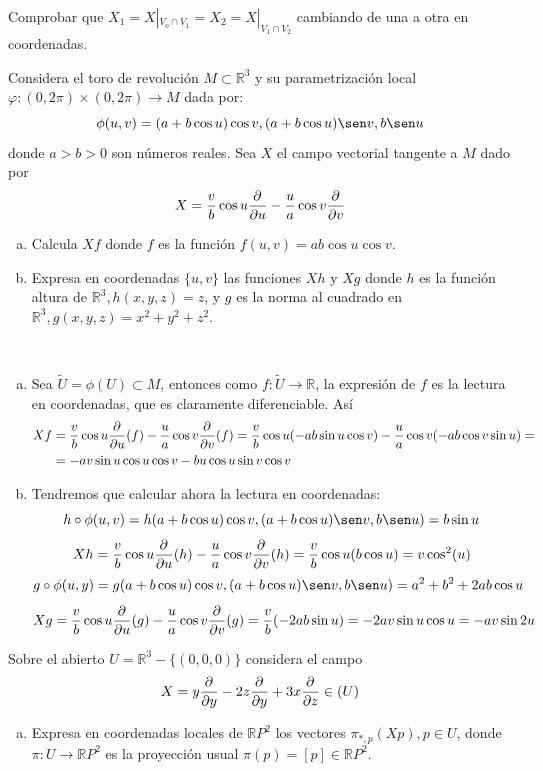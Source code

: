 \begin{sol}
    Comprobar que $X_1=X|_{V_o \cap V_1} = X_2 = X|_{V_1\cap V_2}$ cambiando de una a otra en coordenadas.
\end{sol}
\begin{ejer}
    [4.3] Considera el toro de revoluci\'on $M \subset \mathbb R^3$ y su parametrizaci\'on local $\varphi : (0, 2\pi) \times (0, 2\pi)\to M$ dada por: 
    $$\phi(u, v) = (a + b \cos u) \cos v, (a + b \cos u) \sen v, b \sen u $$ donde $a > b > 0$ son n\'umeros reales. Sea $X$ el campo vectorial tangente a $M$ dado por $$X = \frac{v}{b} \cos u \dfrac{\partial^{} }{\partial u} - \frac{u}{a} \cos v \dfrac{\partial^{} }{\partial v}$$
    \begin{enumerate}[a)]
        \item Calcula $Xf$ donde $f$ es la funci\'on $f(u, v) = ab \cos u \cos v$.
        \item Expresa en coordenadas $\{u, v\}$ las funciones $Xh$ y $Xg$ donde $h$ es la funci\'on altura de $\mathbb R^3, h(x, y, z) = z$, y $g$ es la norma al cuadrado en $\mathbb R^3, g(x, y, z) = x^2 + y^2 + z^2$.
    \end{enumerate}
\end{ejer}\begin{sol}\, \begin{enumerate}[a)]
    \item Sea $\tilde U = \phi(U) \subset M$, entonces como $f:\tilde U \longrightarrow \mathbb R$, la expresi\'on de $f$ es la lectura en coordenadas, que es claramente diferenciable. As\'i
    \[\begin{split} Xf & =\frac{v}{b} \cos u \dfrac{\partial^{} }{\partial u}(f) - \frac{u}{a} \cos v \dfrac{\partial^{} }{\partial v}(f) = \frac{v}{b} \cos u (-ab\sin u \cos v) - \frac{u}{a} \cos v (-ab\cos v \sin u) = \\ & = -av \sin u \cos u \cos v - bu \cos u \sin v \cos v\end{split}\]
    \item Tendremos que calcular ahora la lectura en coordenadas:
    $$h \circ \phi(u,v) = h(a + b \cos u) \cos v, (a + b \cos u) \sen v, b \sen u) = b\sin u$$
    $$Xh  = \frac{v}{b} \cos u \dfrac{\partial^{} }{\partial u}(h) - \frac{u}{a} \cos v \dfrac{\partial^{} }{\partial v}(h)=\frac{v}{b} \cos u (b \cos u)=v \cos^2(u)$$
    $$g\circ \phi(u,y) = g(a + b \cos u) \cos v, (a + b \cos u) \sen v, b \sen u) = a^2+b^2+2ab \cos u$$
    $$Xg =\frac{v}{b} \cos u \dfrac{\partial^{} }{\partial u}(g) - \frac{u}{a} \cos v \dfrac{\partial^{} }{\partial v}(g) =\frac{v}{b}(-2ab \sin u) = -2av\sin u \cos u = -av \sin 2u$$
\end{enumerate}
\end{sol}
\begin{ejer}
    [4.6] Sobre el abierto $U =\mathbb R^3 - \{(0, 0, 0)\}$ considera el campo
    $$X=y\dfrac{\partial^{} }{\partial y}-2z\dfrac{\partial^{} }{\partial y}+3x \dfrac{\partial^{} }{\partial z} \in \mathfrak (U)$$
    \begin{enumerate}[a)]
        \item Expresa en coordenadas locales de $\mathbb RP^2$ los  vectores $\pi_{*,p}(Xp), p \in U$, donde
$\pi : U \to \mathbb RP^2$ es la proyecci\'on usual $\pi(p) = [p] \in \mathbb RP^2$.
    \end{enumerate}
\end{ejer}

